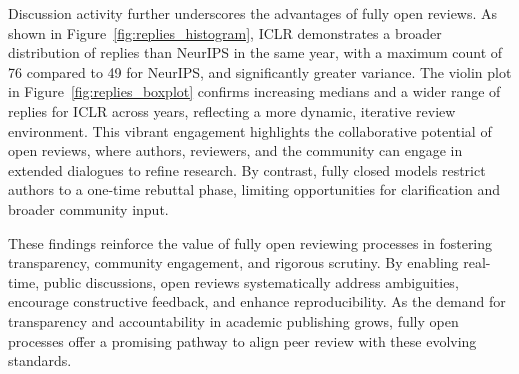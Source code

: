 Discussion activity further underscores the advantages of fully open reviews. As shown in Figure~\ref{fig:replies_histogram}, ICLR demonstrates a broader distribution of replies than NeurIPS in the same year, with a maximum count of 76 compared to 49 for NeurIPS, and significantly greater variance. The violin plot in Figure~\ref{fig:replies_boxplot} confirms increasing medians and a wider range of replies for ICLR across years, reflecting a more dynamic, iterative review environment. This vibrant engagement highlights the collaborative potential of open reviews, where authors, reviewers, and the community can engage in extended dialogues to refine research. By contrast, fully closed models restrict authors to a one-time rebuttal phase, limiting opportunities for clarification and broader community input.

These findings reinforce the value of fully open reviewing processes in fostering transparency, community engagement, and rigorous scrutiny. By enabling real-time, public discussions, open reviews systematically address ambiguities, encourage constructive feedback, and enhance reproducibility. 
As the demand for transparency and accountability in academic publishing grows, fully open processes offer a promising pathway to align peer review with these evolving standards.


% 


